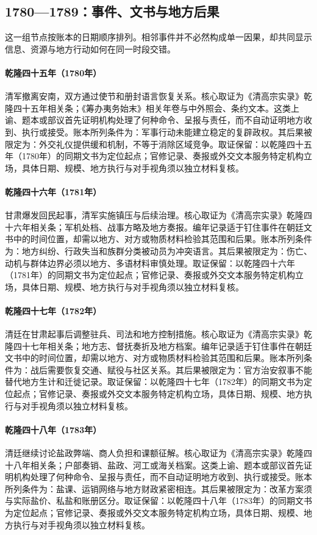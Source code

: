 \subsection{1780—1789：事件、文书与地方后果}
这一组节点按账本的日期顺序排列。相邻事件并不必然构成单一因果，却共同显示信息、资源与地方行动如何在同一时段交错。
\hypertarget{ledger:EQ-1780-VIETNAM-WITHDRAWAL}{}\paragraph{乾隆四十五年（1780年）}清军撤离安南，双方通过使节和册封语言恢复关系。核心取证为《清高宗实录》乾隆四十五年相关条；《筹办夷务始末》相关年卷与中外照会、条约文本。这类上谕、题本或部议首先证明机构处理了何种命令、呈报与责任，而不自动证明地方收到、执行或接受。账本所列条件为：军事行动未能建立稳定的复辟政权。其后果被限定为：外交礼仪提供缓和机制，不等于消除区域竞争。取证保留：以乾隆四十五年（1780年）的同期文书为定位起点；官修记录、奏报或外交文本服务特定机构立场，具体日期、规模、地方执行与对手视角须以独立材料复核。
\hypertarget{ledger:EQ-1781-GANSU-MUSLIM-UPRISING}{}\paragraph{乾隆四十六年（1781年）}甘肃爆发回民起事，清军实施镇压与后续治理。核心取证为《清高宗实录》乾隆四十六年相关条；军机处档、战事方略及地方奏报。编年记录适于钉住事件在朝廷文书中的时间位置，却需以地方、对方或物质材料检验其范围和后果。账本所列条件为：地方纠纷、行政失当和族群分类被动员为冲突语言。其后果被限定为：伤亡、动机与群体边界必须以地方、多语材料审慎处理。取证保留：以乾隆四十六年（1781年）的同期文书为定位起点；官修记录、奏报或外交文本服务特定机构立场，具体日期、规模、地方执行与对手视角须以独立材料复核。
\hypertarget{ledger:EQ-1782-GANSU-POSTWAR-GOVERNANCE}{}\paragraph{乾隆四十七年（1782年）}清廷在甘肃起事后调整驻兵、司法和地方控制措施。核心取证为《清高宗实录》乾隆四十七年相关条；地方志、督抚奏折及地方档案。编年记录适于钉住事件在朝廷文书中的时间位置，却需以地方、对方或物质材料检验其范围和后果。账本所列条件为：战后需要恢复交通、赋役与社区关系。其后果被限定为：官方治安叙事不能替代地方生计和迁徙记录。取证保留：以乾隆四十七年（1782年）的同期文书为定位起点；官修记录、奏报或外交文本服务特定机构立场，具体日期、规模、地方执行与对手视角须以独立材料复核。
\hypertarget{ledger:EQ-1783-SALT-MONOPOLY-REVIEW}{}\paragraph{乾隆四十八年（1783年）}清廷继续讨论盐政弊端、商人负担和课额征解。核心取证为《清高宗实录》乾隆四十八年相关条；户部奏销、盐政、河工或海关档案。这类上谕、题本或部议首先证明机构处理了何种命令、呈报与责任，而不自动证明地方收到、执行或接受。账本所列条件为：盐课、运销网络与地方财政紧密相连。其后果被限定为：改革方案须与实际盐价、私盐和账册区分。取证保留：以乾隆四十八年（1783年）的同期文书为定位起点；官修记录、奏报或外交文本服务特定机构立场，具体日期、规模、地方执行与对手视角须以独立材料复核。

